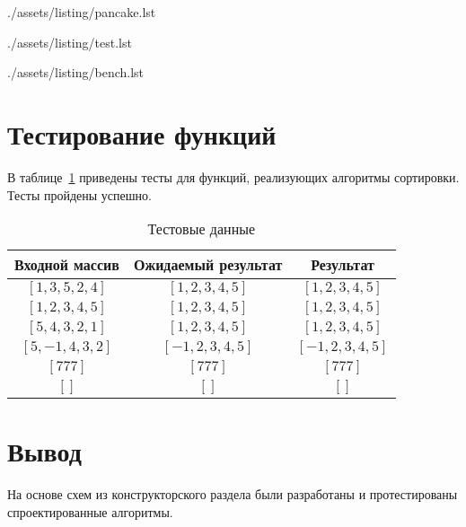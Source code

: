 \clearpage
\begin{lstinputlisting}[
	caption={Алгоритм блинной сортировки},
	label={lst:pancake},
	style={golang}
]{./assets/listing/pancake.lst}
\end{lstinputlisting}

\clearpage
\begin{lstinputlisting}[
	caption={Пример реализации теста},
	label={lst:tests},
	style={golang}
]{./assets/listing/test.lst}
\end{lstinputlisting}

\clearpage
\begin{lstinputlisting}[
	caption={Пример реализации бенчмарка},
	label={lst:benches},
	style={golang}
]{./assets/listing/bench.lst}
\end{lstinputlisting}

\section{Тестирование функций}

В таблице~\ref{tbl:test} приведены тесты для функций, реализующих алгоритмы сортировки.
Тесты пройдены успешно.

\begin{table}[h!]
	\begin{center}
		\caption{\label{tbl:test}Тестовые данные}
		\begin{tabular}{|c|c|c|}
			\hline
			Входной массив & Ожидаемый результат & Результат \\ 
			\hline
			$[1,3,5,2,4]$ & $[1,2,3,4,5]$  & $[1,2,3,4,5]$\\
			$[1,2,3,4,5]$  & $[1,2,3,4,5]$ & $[1,2,3,4,5]$\\
			$[5,4,3,2,1]$  & $[1,2,3,4,5]$  & $[1,2,3,4,5]$\\
			$[5,-1,4,3,2]$  & $[-1,2,3,4,5]$  & $[-1,2,3,4,5]$\\
			$[777]$  & $[777]$  & $[777]$\\
			$[]$  & $[]$  & $[]$\\
			\hline
		\end{tabular}
	\end{center}
\end{table}

\section*{Вывод}

На основе схем из конструкторского раздела были разработаны и протестированы спроектированные алгоритмы.
